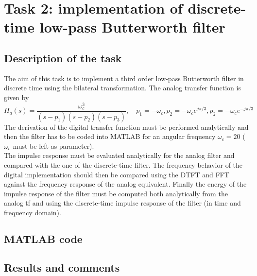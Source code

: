 
\newcommand{\wc}{\omega_c}
\newcommand{\dt}{\Delta_t}
\newcommand{\zi}{z^{-1}}
\newcommand{\zii}{z^{-2}}

\graphicspath{{graphics/task2/}}
\chapter{Task 2: implementation of discrete-time low-pass Butterworth filter}
\section{Description of the task}
The aim of this task is to implement a third order low-pass Butterworth filter in discrete time using the bilateral transformation. The analog transfer function is given by
\begin{equation}\label{eq:t2_analog_tf_text}
H_a(s)=\frac{\wc^3}{(s-p_1)(s-p_2)(s-p_3)}, \quad p_1=-\wc, p_2=-\wc e^{j\pi/3}, p_2=-\wc e^{-j\pi/3}
\end{equation}
The derivation of the digital transfer function must be performed analytically and then the filter has to be coded into MATLAB for an angular frequency $\wc=20$ ($\wc$ must be left as parameter).\\
The impulse response must be evaluated analytically for the analog filter and compared with the one of the discrete-time filter.
The frequency behavior of the digital implementation should then be compared using the DTFT and FFT against the frequency response of the analog equivalent.
Finally the energy of the impulse response of the filter must be computed both analytically from the analog tf and using the discrete-time impulse response of the filter (in time and frequency domain).
\section{MATLAB code}


\pagebreak
\section{Results and comments}
